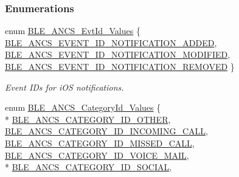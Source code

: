 \subsubsection*{Enumerations}
\begin{DoxyCompactItemize}
\item 
enum \hyperlink{group___b_l_e___a_n_c_s_gaf8fe466493239548694a1a439f5b8bc0}{B\+L\+E\+\_\+\+A\+N\+C\+S\+\_\+\+Evt\+Id\+\_\+\+Values} \{ \hyperlink{group___b_l_e___a_n_c_s_ggaf8fe466493239548694a1a439f5b8bc0a66075787397eadb227b6dd857e236f90}{B\+L\+E\+\_\+\+A\+N\+C\+S\+\_\+\+E\+V\+E\+N\+T\+\_\+\+I\+D\+\_\+\+N\+O\+T\+I\+F\+I\+C\+A\+T\+I\+O\+N\+\_\+\+A\+D\+D\+ED}, 
\hyperlink{group___b_l_e___a_n_c_s_ggaf8fe466493239548694a1a439f5b8bc0a1e700db97914df9d81d0cb400f16e91f}{B\+L\+E\+\_\+\+A\+N\+C\+S\+\_\+\+E\+V\+E\+N\+T\+\_\+\+I\+D\+\_\+\+N\+O\+T\+I\+F\+I\+C\+A\+T\+I\+O\+N\+\_\+\+M\+O\+D\+I\+F\+I\+ED}, 
\hyperlink{group___b_l_e___a_n_c_s_ggaf8fe466493239548694a1a439f5b8bc0ac3f9348dafe4745f276318f4f7778c13}{B\+L\+E\+\_\+\+A\+N\+C\+S\+\_\+\+E\+V\+E\+N\+T\+\_\+\+I\+D\+\_\+\+N\+O\+T\+I\+F\+I\+C\+A\+T\+I\+O\+N\+\_\+\+R\+E\+M\+O\+V\+ED}
 \}\begin{DoxyCompactList}\small\item\em Event I\+Ds for i\+OS notifications. \end{DoxyCompactList}
\item 
enum \hyperlink{group___b_l_e___a_n_c_s_ga982bbd8a00c6ecff960d5196576dbba0}{B\+L\+E\+\_\+\+A\+N\+C\+S\+\_\+\+Category\+Id\+\_\+\+Values} \{ \\*
\hyperlink{group___b_l_e___a_n_c_s_gga982bbd8a00c6ecff960d5196576dbba0ac5413e8b060d9b1882c7a84010fec4c3}{B\+L\+E\+\_\+\+A\+N\+C\+S\+\_\+\+C\+A\+T\+E\+G\+O\+R\+Y\+\_\+\+I\+D\+\_\+\+O\+T\+H\+ER}, 
\hyperlink{group___b_l_e___a_n_c_s_gga982bbd8a00c6ecff960d5196576dbba0aa0f8b1b168859591faeec569fdcf7a25}{B\+L\+E\+\_\+\+A\+N\+C\+S\+\_\+\+C\+A\+T\+E\+G\+O\+R\+Y\+\_\+\+I\+D\+\_\+\+I\+N\+C\+O\+M\+I\+N\+G\+\_\+\+C\+A\+LL}, 
\hyperlink{group___b_l_e___a_n_c_s_gga982bbd8a00c6ecff960d5196576dbba0a033a18372c7602c18bbe1a301a3844ff}{B\+L\+E\+\_\+\+A\+N\+C\+S\+\_\+\+C\+A\+T\+E\+G\+O\+R\+Y\+\_\+\+I\+D\+\_\+\+M\+I\+S\+S\+E\+D\+\_\+\+C\+A\+LL}, 
\hyperlink{group___b_l_e___a_n_c_s_gga982bbd8a00c6ecff960d5196576dbba0ad9b4d8723097d5935a94d1bce7d47178}{B\+L\+E\+\_\+\+A\+N\+C\+S\+\_\+\+C\+A\+T\+E\+G\+O\+R\+Y\+\_\+\+I\+D\+\_\+\+V\+O\+I\+C\+E\+\_\+\+M\+A\+IL}, 
\\*
\hyperlink{group___b_l_e___a_n_c_s_gga982bbd8a00c6ecff960d5196576dbba0a9845cb9f72892b9a89a87f3ad137dd92}{B\+L\+E\+\_\+\+A\+N\+C\+S\+\_\+\+C\+A\+T\+E\+G\+O\+R\+Y\+\_\+\+I\+D\+\_\+\+S\+O\+C\+I\+AL}, 

\end{DoxyCompactItemize}
